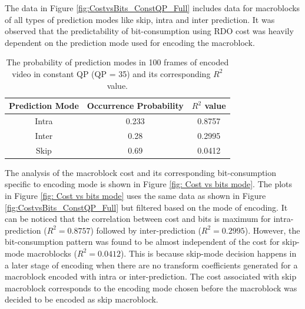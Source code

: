 \documentclass[11pt]{article} %
\begin{document}
The data in Figure \ref{fig:CostvsBits_ConstQP_Full} includes data for macroblocks of all types of prediction modes like skip, intra and inter prediction. It was observed that the predictability of bit-consumption using RDO cost was heavily dependent on the prediction mode used for encoding the macroblock. 

\begin{table} [h!]
	\centering
	\begin{tabular}{ |c|c|c| }
		\hline
		\textbf{Prediction Mode} & \textbf{Occurrence Probability } & \textbf{$R^2$ value} \\
		\hline 
		Intra & 0.233 & 0.8757  \\
		\hline
		Inter & 0.28 & 0.2995  \\
		\hline
		Skip &  0.69 & 0.0412 \\ 
		\hline					
	\end{tabular}
	\caption{The probability of prediction modes in 100 frames of encoded video in constant QP (QP = 35) and its corresponding $R^2$ value.}
	\label{Table:Mode Specific data}
\end{table}

The analysis of the macroblock cost and its corresponding bit-consumption specific to encoding mode is shown in Figure \ref{fig: Cost vs bits mode}. The plots in Figure \ref{fig: Cost vs bits mode} uses the same data as shown in Figure \ref{fig:CostvsBits_ConstQP_Full} but filtered based on the mode of encoding. It can be noticed that the correlation between cost and bits is maximum for intra-prediction ($R^2 = 0.8757$) followed by inter-prediction ($R^2 = 0.2995$). However, the bit-consumption pattern was found to be almost independent of the cost for skip-mode macroblocks ($R^2 = 0.0412$). This is because skip-mode decision happens in a later stage of encoding when there are no transform coefficients generated for a macroblock encoded with intra or inter-prediction. The cost associated with skip macroblock corresponds to the encoding mode chosen before the macroblock was decided to be encoded as skip macroblock.
\end{document}
